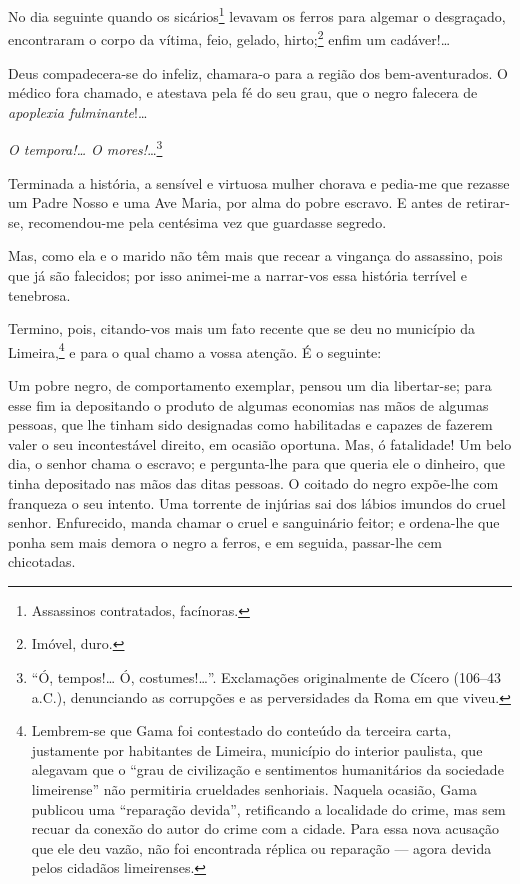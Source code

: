 No dia seguinte quando os sicários\footnote{Assassinos contratados,
  facínoras.} levavam os ferros para algemar o desgraçado, encontraram o
corpo da vítima, feio, gelado, hirto;\footnote{Imóvel, duro.} enfim um
cadáver!\ldots{}

Deus compadecera-se do infeliz, chamara-o para a região dos
bem-aventurados. O médico fora chamado, e atestava pela fé do seu grau,
que o negro falecera de \emph{apoplexia fulminante}!\ldots{}

\emph{O tempora!\ldots{} O mores!}\ldots{}\footnote{``Ó, tempos!\ldots{} Ó,
  costumes!\ldots{}''. Exclamações originalmente de Cícero (106--43 a.C.), 
  denunciando as corrupções e as perversidades da Roma em que viveu.}

Terminada a história, a sensível e virtuosa mulher chorava e pedia-me
que rezasse um Padre Nosso e uma Ave Maria, por alma do pobre escravo. E
antes de retirar-se, recomendou-me pela centésima vez que guardasse
segredo.

Mas, como ela e o marido não têm mais que recear a vingança do
assassino, pois que já são falecidos; por isso animei-me a narrar-vos
essa história terrível e tenebrosa.

Termino, pois, citando-vos mais um fato recente que se deu no município
da Limeira,\footnote{Lembrem-se que Gama foi contestado do conteúdo da
  terceira carta, justamente por habitantes de Limeira, município do
  interior paulista, que alegavam que o ``grau de civilização e
  sentimentos humanitários da sociedade limeirense'' não permitiria
  crueldades senhoriais. Naquela ocasião, Gama publicou uma ``reparação
  devida'', retificando a localidade do crime, mas sem recuar da conexão
  do autor do crime com a cidade. Para essa nova acusação que ele deu vazão,
  não foi encontrada réplica ou reparação --- agora devida pelos
  cidadãos limeirenses.} e para o qual chamo a vossa atenção. É o
seguinte:

Um pobre negro, de comportamento exemplar, pensou um dia libertar-se;
para esse fim ia depositando o produto de algumas economias nas mãos de
algumas pessoas, que lhe tinham sido designadas como habilitadas e
capazes de fazerem valer o seu incontestável direito, em ocasião
oportuna. Mas, ó fatalidade! Um belo dia, o senhor chama o escravo; e
pergunta-lhe para que queria ele o dinheiro, que tinha depositado nas
mãos das ditas pessoas. O coitado do negro expõe-lhe com franqueza o seu
intento. Uma torrente de injúrias sai dos lábios imundos do cruel
senhor. Enfurecido, manda chamar o cruel e sanguinário feitor; e
ordena-lhe que ponha sem mais demora o negro a ferros, e em seguida,
passar-lhe cem chicotadas.

